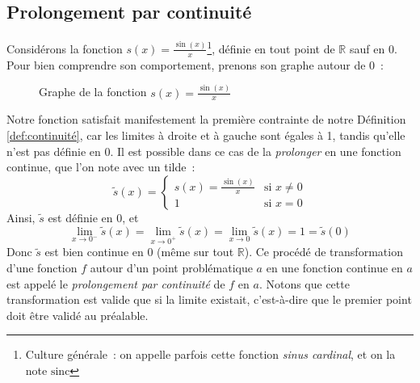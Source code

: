 \subsection{Prolongement par continuité}
Considérons la fonction $s(x) = \frac{\sin(x)}{x}$\footnote{Culture générale~: on appelle parfois cette fonction \emph{sinus cardinal}, et on la note $\mathrm{sinc}$}, définie en tout point de $\mathbb{R}$ sauf en 0. Pour bien comprendre son comportement, prenons son graphe autour de 0~:
\begin{figure}[H]
    \centering
    \caption{Graphe de la fonction $s(x) = \frac{\sin(x)}{x}$}
    \label{fig:sin_over_x}
\end{figure}
Notre fonction satisfait manifestement la première contrainte de notre Définition \ref{def:continuité}, car les limites à droite et à gauche sont égales à 1, tandis qu'elle n'est pas définie en 0. Il est possible dans ce cas de la \emph{prolonger} en une fonction continue, que l'on note avec un tilde~:
\begin{equation}
\tilde{s}(x) = \begin{cases}
s(x) = \frac{\sin(x)}{x} & \textrm{si } x \neq 0 \\
1 & \textrm{si } x = 0
\end{cases}
\end{equation}
Ainsi, $\tilde{s}$ est définie en 0, et
\begin{equation}
\lim_{x \to 0^{-}} \tilde{s}(x) = \lim_{x \to 0^{+}} \tilde{s}(x) = \lim_{x \to 0} \tilde{s}(x) = 1 = \tilde{s}(0)
\end{equation}
Donc $\tilde{s}$ est bien continue en 0 (même sur tout $\mathbb{R}$). Ce procédé de transformation d'une fonction $f$ autour d'un point problématique $a$ en une fonction continue en $a$ est appelé le \emph{prolongement par continuité} de $f$ en $a$. Notons que cette transformation est valide que si la limite existait, c'est-à-dire que le premier point doit être validé au préalable.

